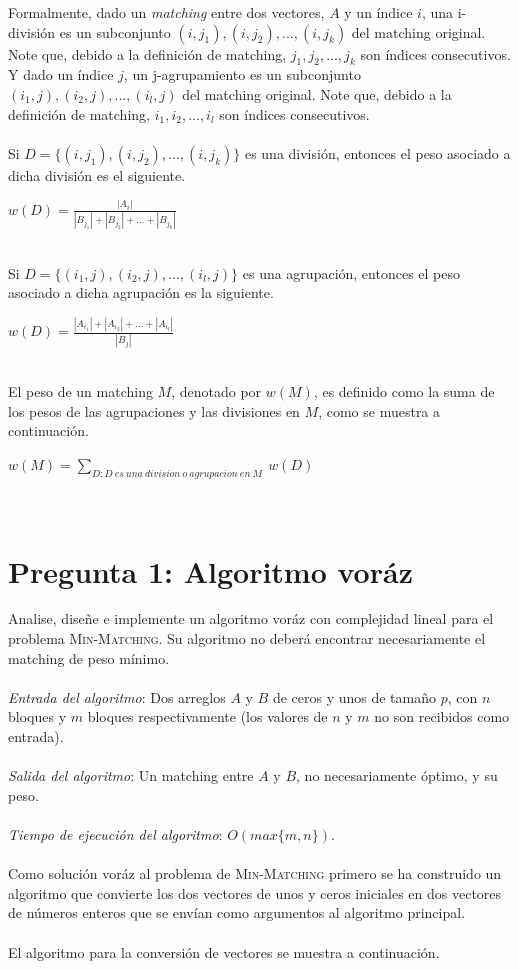 \documentclass[conference]{IEEEtran}
\begin{document}
Formalmente, dado un \textit{matching} entre dos vectores, $A$ y un índice $i$, una i-división es un subconjunto $(i,j_1),(i,j_2),...,(i,j_k)$ del matching original. Note que, debido a la definición de matching, $j_1,j_2,...,j_k$ son índices consecutivos. Y dado un índice $j$, un j-agrupamiento es un subconjunto $(i_1,j),(i_2,j),...,(i_l,j)$ del matching original. Note que, debido a la definición de matching, $i_1,i_2,...,i_l$ son índices consecutivos.\\\\
Si $D=\{(i,j_1),(i,j_2),...,(i,j_k)\}$ es una división, entonces el peso asociado a dicha división es el siguiente.\\
\begin{center}
    $w\left(D\right)=\frac{\left|A_i\right|}{\left|B_{j_1}\right|+\left|B_{j_2}\right|+...+\left|B_{j_k}\right|}$
\end{center}
\verb| |\\
Si $D=\{(i_1,j),(i_2,j),...,(i_l,j)\}$ es una agrupación, entonces el peso asociado a dicha agrupación es la siguiente.\\
\begin{center}
    $w\left(D\right)=\frac{\left|A_{i_1}\right|+\left|A_{i_2}\right|+...+\left|A_{i_l}\right|}{\left|B_j\right|}$
\end{center}
\verb| |\\
El peso de un matching $M$, denotado por $w(M)$, es definido como la suma de los pesos de las agrupaciones y las divisiones en $M$, como se muestra a continuación.\\
\begin{center}
    $w\left(M\right)=\sum _{D:D\:es\:una\:division\:o\:agrupacion\:en\:M}\:w\left(D\right)$
\end{center}
\verb| |

\section{Pregunta 1: Algoritmo voráz}
Analise, diseñe e implemente un algoritmo voráz con complejidad
lineal para el problema \textsc{Min-Matching}. Su algoritmo no deberá encontrar necesariamente el matching de peso mínimo.\\\\
\textit{Entrada del algoritmo}: Dos arreglos $A$ y $B$ de ceros y unos de tamaño $p$, con $n$ bloques y $m$ bloques respectivamente (los valores de $n$ y $m$ no son recibidos como entrada).\\\\
\textit{Salida del algoritmo}: Un matching entre $A$ y $B$, no necesariamente óptimo, y su peso.\\\\
\textit{Tiempo de ejecución del algoritmo}: $O(max\{m,n\})$.\\\\
Como solución voráz al problema de \textsc{Min-Matching} primero se ha construido un algoritmo que convierte los dos vectores de unos y ceros iniciales en dos vectores de números enteros que se envían como argumentos al algoritmo principal.\\\\
El algoritmo para la conversión de vectores se muestra a continuación.
\end{document}
